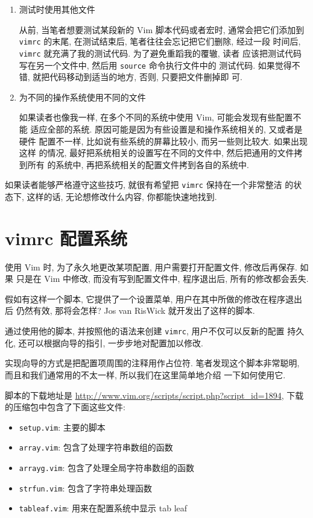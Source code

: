 \begin{enumerate}
    \item 测试时使用其他文件

    从前, 当笔者想要测试某段新的 Vim 脚本代码或者宏时, 通常会把它们添加到
    \texttt{vimrc} 的末尾, 在测试结束后, 笔者往往会忘记把它们删除, 经过一段
    时间后, \texttt{vimrc} 就充满了我的测试代码. 为了避免重蹈我的覆辙, 读者
    应该把测试代码写在另一个文件中, 然后用 \texttt{source} 命令执行文件中的
    测试代码. 如果觉得不错, 就把代码移动到适当的地方, 否则, 只要把文件删掉即
    可.

	\item 为不同的操作系统使用不同的文件

	如果读者也像我一样, 在多个不同的系统中使用 Vim, 可能会发现有些配置不能
	适应全部的系统. 原因可能是因为有些设置是和操作系统相关的, 又或者是硬件
	配置不一样, 比如说有些系统的屏幕比较小, 而另一些则比较大. 如果出现这样
	的情况, 最好把系统相关的设置写在不同的文件中, 然后把通用的文件拷到所有
	的系统中, 再把系统相关的配置文件拷到各自的系统中.
\end{enumerate}

如果读者能够严格遵守这些技巧, 就很有希望把 \texttt{vimrc} 保持在一个非常整洁
的状态下, 这样的话, 无论想修改什么内容, 你都能快速地找到.

\section{vimrc 配置系统}
\label{sec:a_vimrc_setup_system}

使用 Vim 时, 为了永久地更改某项配置, 用户需要打开配置文件, 修改后再保存. 如果
只是在 Vim 中修改, 而没有写到配置文件中, 程序退出后, 所有的修改都会丢失.

假如有这样一个脚本, 它提供了一个设置菜单, 用户在其中所做的修改在程序退出后
仍然有效, 那将会怎样? Jos van RisWick 就开发出了这样的脚本.

通过使用他的脚本, 并按照他的语法来创建 \texttt{vimrc}, 用户不仅可以反新的配置
持久化, 还可以根据向导的指引, 一步步地对配置加以修改.

实现向导的方式是把配置项周围的注释用作占位符.
笔者发现这个脚本非常聪明, 而且和我们通常用的不太一样, 所以我们在这里简单地介绍
一下如何使用它.

脚本的下载地址是 \url{http://www.vim.org/scripts/script.php?script_id=1894},
下载的压缩包中包含了下面这些文件:
\begin{itemize}
  \item \texttt{setup.vim}: 主要的脚本
  \item \texttt{array.vim}: 包含了处理字符串数组的函数
  \item \texttt{arrayg.vim}: 包含了处理全局字符串数组的函数
  \item \texttt{strfun.vim}: 包含了字符串处理函数
  \item \texttt{tableaf.vim}: 用来在配置系统中显示 tab leaf
\end{itemize}

